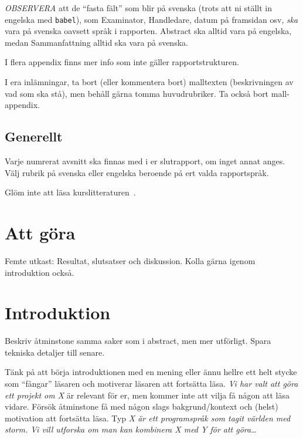 \documentclass[swedish, a4paper,12pt]{article}
\begin{document}
\emph{OBSERVERA} att de ``fasta fält'' som blir på svenska (trots att ni ställt in engelska med \texttt{babel}), som Examinator, Handledare, datum på framsidan osv, \emph{ska} vara på svenska oavsett språk i rapporten. Abstract ska alltid vara på engelska, medan Sammanfattning alltid ska vara på svenska.

I flera appendix finns mer info som inte gäller rapportstrukturen.

I era inlämningar, ta bort (eller kommentera bort) malltexten (beskrivningen av vad som ska stå), men behåll gärna tomma huvudrubriker. Ta också bort mall-appendix.

\subsection*{Generellt}
Varje numrerat avsnitt ska finnas med i er slutrapport, om inget annat anges.
Välj rubrik på svenska eller engelska beroende på ert valda rapportspråk.

Glöm inte att läsa kurslitteraturen~\cite{dawson:projects-in-computing,dawson:projects-in-computing-old}.
\fi




\section*{Att göra}
Femte utkast: Resultat, slutsatser och diskussion. Kolla gärna igenom introduktion också.

\newpage %

\section{Introduktion}
\iffalse Beskriv åtminstone samma saker som i abstract, men mer utförligt. Spara tekniska detaljer till senare.

Tänk på att börja introduktionen med en mening eller ännu hellre ett helt stycke som ``fångar'' läsaren och motiverar läsaren att fortsätta läsa.  \emph{Vi har valt att göra ett projekt om X} är relevant för er, men kommer inte att vilja få någon att läsa vidare.  Försök åtminstone få med någon slags bakgrund/kontext och (helst) motivation att fortsätta läsa.  Typ \emph{X är ett programspråk som tagit världen med storm.  Vi vill utforska om man kan kombinera X med Y för att göra\ldots}
\end{document}

